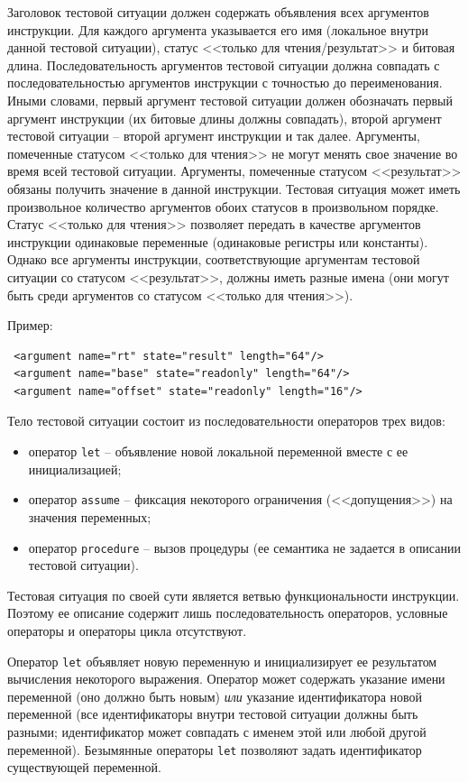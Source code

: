 Заголовок тестовой ситуации должен содержать объявления всех
аргументов инструкции. Для каждого аргумента указывается его имя
(локальное внутри данной тестовой ситуации), статус <<только для
чтения/результат>> и битовая длина. Последовательность аргументов
тестовой ситуации должна совпадать с последовательностью аргументов
инструкции с точностью до переименования. Иными словами, первый
аргумент тестовой ситуации должен обозначать первый аргумент
инструкции (их битовые длины должны совпадать), второй аргумент
тестовой ситуации -- второй аргумент инструкции и так далее.
Аргументы, помеченные статусом <<только для чтения>> не могут менять
свое значение во время всей тестовой ситуации. Аргументы, помеченные
статусом <<результат>> обязаны получить значение в данной
инструкции. Тестовая ситуация может иметь произвольное количество
аргументов обоих статусов в произвольном порядке. Статус <<только
для чтения>> позволяет передать в качестве аргументов инструкции
одинаковые переменные (одинаковые регистры или константы). Однако
все аргументы инструкции, соответствующие аргументам тестовой
ситуации со статусом <<результат>>, должны иметь разные имена (они
могут быть среди аргументов со статусом <<только для чтения>>).

Пример: {\small
\begin{verbatim}
 <argument name="rt" state="result" length="64"/>
 <argument name="base" state="readonly" length="64"/>
 <argument name="offset" state="readonly" length="16"/>
\end{verbatim}}

Тело тестовой ситуации состоит из последовательности операторов трех
видов:
\begin{itemize}
  \item оператор \texttt{let} -- объявление новой локальной
  переменной вместе с ее инициализацией;
  \item оператор \texttt{assume} -- фиксация некоторого ограничения
  (<<допущения>>) на значения переменных;
  \item оператор \texttt{procedure} -- вызов процедуры (ее семантика
    не задается в описании тестовой ситуации).
\end{itemize}

Тестовая ситуация по своей сути является ветвью функциональности
инструкции. Поэтому ее описание содержит лишь последовательность
операторов, условные операторы и операторы цикла отсутствуют.

Оператор \texttt{let} объявляет новую переменную и инициализирует ее
результатом вычисления некоторого выражения. Оператор может
содержать указание имени переменной (оно должно быть новым)
\emph{или} указание идентификатора новой переменной (все
идентификаторы внутри тестовой ситуации должны быть разными;
идентификатор может совпадать с именем этой или любой другой
переменной). Безымянные операторы \texttt{let} позволяют задать
идентификатор существующей переменной.

